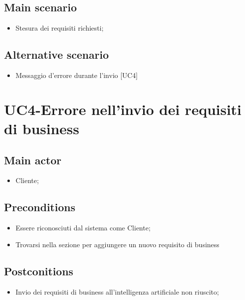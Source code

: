 \documentclass{article}
\begin{document}
     \subsection*{Main scenario}

        \begin{itemize}
            \item Stesura dei requisiti richiesti;
        \end{itemize}
     \subsection*{Alternative scenario}
        \begin{itemize}
            \item Messaggio d'errore durante l'invio [UC4]
        \end{itemize}

\section{UC4-Errore nell'invio dei requisiti di business}

     \subsection*{Main actor}
     \begin{itemize}
         \item Cliente;
     \end{itemize}
     \subsection*{Preconditions} 
     \begin{itemize}
         \item Essere riconosciuti dal sistema come Cliente;
         \item Trovarsi nella sezione per aggiungere un nuovo requisito di business
     \end{itemize}
     \subsection*{Postconitions} 
        \begin{itemize}
            \item Invio dei requisiti di business all'intelligenza artificiale non riuscito;
        \end{itemize}
\end{document}
